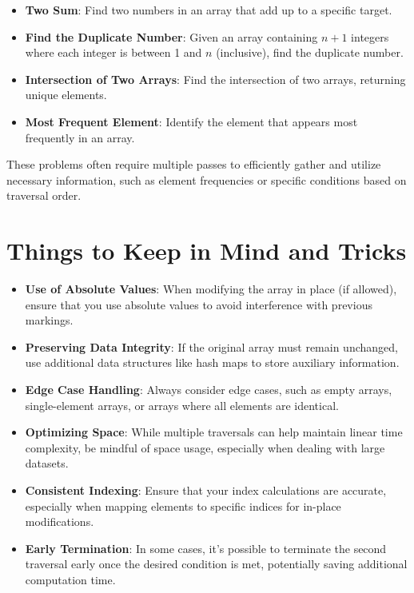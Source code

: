 \begin{itemize}
    \item \textbf{Two Sum}: Find two numbers in an array that add up to a specific target.
    \item \textbf{Find the Duplicate Number}: Given an array containing \(n + 1\) integers where each integer is between 1 and \(n\) (inclusive), find the duplicate number.
    \item \textbf{Intersection of Two Arrays}: Find the intersection of two arrays, returning unique elements.
    \item \textbf{Most Frequent Element}: Identify the element that appears most frequently in an array.
\end{itemize}

These problems often require multiple passes to efficiently gather and utilize necessary information, such as element frequencies or specific conditions based on traversal order.

\section*{Things to Keep in Mind and Tricks}

\begin{itemize}
    \item \textbf{Use of Absolute Values}: When modifying the array in place (if allowed), ensure that you use absolute values to avoid interference with previous markings.
    
    \item \textbf{Preserving Data Integrity}: If the original array must remain unchanged, use additional data structures like hash maps to store auxiliary information.
    
    \item \textbf{Edge Case Handling}: Always consider edge cases, such as empty arrays, single-element arrays, or arrays where all elements are identical.
    
    \item \textbf{Optimizing Space}: While multiple traversals can help maintain linear time complexity, be mindful of space usage, especially when dealing with large datasets.
    
    \item \textbf{Consistent Indexing}: Ensure that your index calculations are accurate, especially when mapping elements to specific indices for in-place modifications.
    
    \item \textbf{Early Termination}: In some cases, it's possible to terminate the second traversal early once the desired condition is met, potentially saving additional computation time.
\end{itemize}

